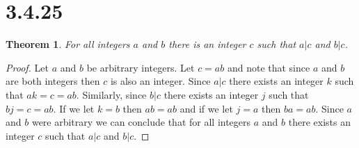 \documentclass{article}
\newtheorem*{theorem}{Theorem}  %
\begin{document}
\section*{3.4.25}
\begin{theorem} For all integers $a$ and $b$ there is an integer $c$ such that $a|c$ and $b|c$.
\end{theorem}
\begin{proof}
Let $a$ and $b$ be arbitrary integers. Let $c = ab$ and note that since $a$ and $b$ are both integers then $c$ is also an integer. Since $a|c$ there exists an integer $k$ such that $ak = c = ab$. Similarly, since $b|c$ there exists an integer $j$ such that $bj = c = ab$. If we let $k = b$ then $ab = ab$ and if we let $j = a$ then $ba = ab$. Since $a$ and $b$ were arbitrary we can conclude that for all integers $a$ and $b$ there exists an integer $c$ such that $a|c$ and $b|c$.
\end{proof}
\end{document}
